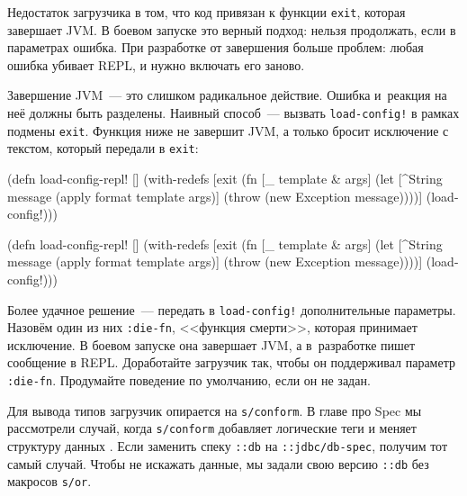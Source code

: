 
Недостаток загрузчика в том, что код привязан к функции \verb|exit|, которая
завершает JVM. В боевом запуске это верный подход: нельзя продолжать, если в
параметрах ошибка. При разработке от завершения больше проблем: любая ошибка
убивает REPL, и нужно включать его заново.

Завершение JVM~--- это слишком радикальное действие. Ошибка и~реакция на неё
должны быть разделены. Наивный способ~--- вызвать \verb|load-config!| в рамках
подмены \verb|exit|. Функция ниже не завершит JVM, а только бросит исключение
с текстом, который передали в \verb|exit|:

\ifx\devicetype\mobile

\begin{english}
  \begin{clojure}
(defn load-config-repl! []
  (with-redefs
    [exit
     (fn [_ template & args]
       (let [^String message
             (apply format
               template args)]
         (throw
           (new Exception message))))]
    (load-config!)))
  \end{clojure}
\end{english}

\else

\begin{english}
  \begin{clojure}
(defn load-config-repl! []
  (with-redefs
    [exit (fn [_ template & args]
            (let [^String message
                  (apply format template args)]
              (throw (new Exception message))))]
    (load-config!)))
  \end{clojure}
\end{english}

\fi


Более удачное решение~--- передать в \verb|load-config!| дополнительные
параметры. Назовём один из них \verb|:die-fn|, <<функция смерти>>, которая
принимает исключение. В боевом запуске она завершает JVM, а в~разработке пишет
сообщение в REPL. Доработайте загрузчик так, чтобы он поддерживал параметр
\verb|:die-fn|. Продумайте поведение по умолчанию, если он не задан.

Для вывода типов загрузчик опирается на \verb|s/conform|. В главе про Spec мы
рассмотрели случай, когда \verb|s/conform| добавляет логические теги и меняет
структуру данных . Если заменить спеку \verb|::db| на
\verb|::jdbc/db-spec|, получим тот самый случай. Чтобы не искажать данные, мы
задали свою версию \verb|::db| без макросов \verb|s/or|.

